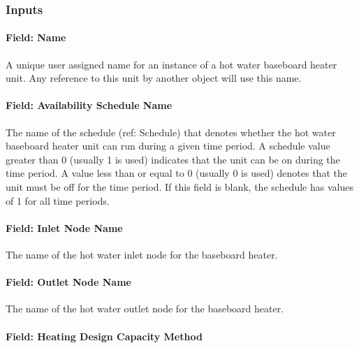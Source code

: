 \subsubsection{Inputs}\label{inputs-3-028}

\paragraph{Field: Name}\label{field-name-3-025}

A unique user assigned name for an instance of a hot water baseboard heater unit. Any reference to this unit by another object will use this name.

\paragraph{Field: Availability Schedule Name}\label{field-availability-schedule-name-3-005}

The name of the schedule (ref: Schedule) that denotes whether the hot water baseboard heater unit can run during a given time period. A schedule value greater than 0 (usually 1 is used) indicates that the unit can be on during the time period. A value less than or equal to 0 (usually 0 is used) denotes that the unit must be off for the time period. If this field is blank, the schedule has values of 1 for all time periods.

\paragraph{Field: Inlet Node Name}\label{field-inlet-node-name-2-002}

The name of the hot water inlet node for the baseboard heater.

\paragraph{Field: Outlet Node Name}\label{field-outlet-node-name-2-002}

The name of the hot water outlet node for the baseboard heater.

\paragraph{Field: Heating Design Capacity Method}\label{field-heating-design-capacity-method-3}

